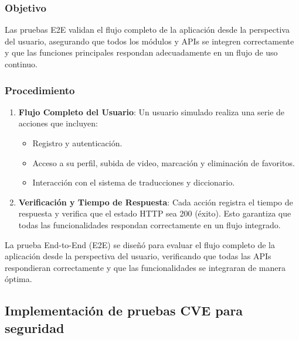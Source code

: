\subsubsection{Objetivo}
Las pruebas E2E validan el flujo completo de la aplicación desde la perspectiva del usuario, asegurando que todos los módulos y APIs se integren correctamente y que las funciones principales respondan adecuadamente en un flujo de uso continuo.

\subsubsection{Procedimiento}
\begin{enumerate}
    \item \textbf{Flujo Completo del Usuario}: Un usuario simulado realiza una serie de acciones que incluyen:
    \begin{itemize}
        \item Registro y autenticación.
        \item Acceso a su perfil, subida de video, marcación y eliminación de favoritos.
        \item Interacción con el sistema de traducciones y diccionario.
    \end{itemize}
    \item \textbf{Verificación y Tiempo de Respuesta}: Cada acción registra el tiempo de respuesta y verifica que el estado HTTP sea 200 (éxito). Esto garantiza que todas las funcionalidades respondan correctamente en un flujo integrado.
\end{enumerate}

La prueba End-to-End (E2E) se diseñó para evaluar el flujo completo de la aplicación desde la perspectiva del usuario, verificando que todas las APIs respondieran correctamente y que las funcionalidades se integraran de manera óptima. 

\subsection{Implementación de pruebas CVE para seguridad}

